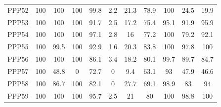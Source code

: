 \documentclass[authoryearcitations]{UoYCSproject}
\begin{document}
\begin{appendices}
\begin{table}
\begin{tabular}{|l|c|c|c|c|c|c|c|c|c|c}
PPP52&100&100&100&99.8&2.2&21.3&78.9&100&24.5&19.9\\
PPP53&100&100&100&91.7&2.5&17.2&75.4&95.1&91.9&95.9\\
PPP54&100&100&100&97.1&2.8&16&77.2&100&79.2&92.1\\
PPP55&100&99.5&100&92.9&1.6&20.3&83.8&100&97.8&100\\
PPP56&100&100&100&86.1&3.4&18.2&80.1&99.7&89.7&84.7\\
PPP57&100&48.8&0&72.7&0&9.4&63.1&93&47.9&46.6\\
PPP58&100&86.7&100&82.1&0&27.7&69.1&98.9&83&94\\
PPP59&100&100&100&95.7&2.5&21&80&100&98.8&100\\
\end{tabular}
\end{table}

\end{appendices}
\end{document}
